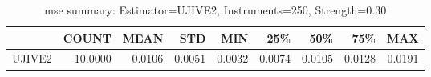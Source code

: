 \begin{table}[ht]
\centering
\caption{mse summary: Estimator=UJIVE2, Instruments=250, Strength=0.30}
\begin{tabular}{lrrrrrrrr}
\toprule
 & COUNT & MEAN & STD & MIN & 25\% & 50\% & 75\% & MAX \\
\midrule
UJIVE2 & 10.0000 & 0.0106 & 0.0051 & 0.0032 & 0.0074 & 0.0105 & 0.0128 & 0.0191 \\
\bottomrule
\end{tabular}
\end{table}
